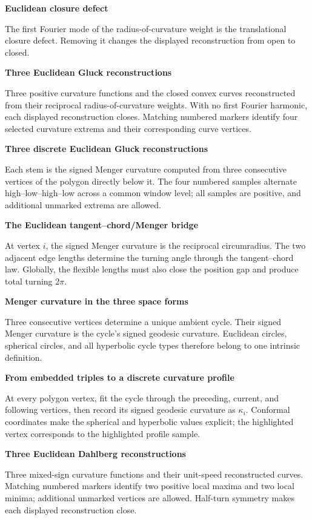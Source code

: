 \documentclass[a4paper,landscape]{article}
\newcommand{\illustrationpage}[3]{%
  \begin{center}
    \vspace*{\fill}
    {\LARGE\bfseries #2\par}
    \vspace{1.25cm}
    \resizebox{0.98\textwidth}{!}{}%
    \vspace{1.1cm}

    \begin{minipage}{0.86\textwidth}
      \centering\large #3
    \end{minipage}
    \vspace*{\fill}
  \end{center}%
}
\begin{document}
\illustrationpage{euclidean-closure}
  {Euclidean closure defect}
  {The first Fourier mode of the radius-of-curvature weight is the
   translational closure defect. Removing it changes the displayed
   reconstruction from open to closed.}

\newpage
\illustrationpage{euclidean-gluck-reconstructions}
  {Three Euclidean Gluck reconstructions}
  {Three positive curvature functions and the closed convex curves reconstructed
   from their reciprocal radius-of-curvature weights. With no first Fourier
   harmonic, each displayed reconstruction closes. Matching numbered markers
   identify four selected curvature extrema and their corresponding curve vertices.}

\newpage
\illustrationpage{discrete-gluck-menger-reconstructions}
  {Three discrete Euclidean Gluck reconstructions}
  {Each stem is the signed Menger curvature computed from three consecutive
   vertices of the polygon directly below it. The four numbered samples
   alternate high--low--high--low across a common window level; all samples are
   positive, and additional unmarked extrema are allowed.}

\newpage
\illustrationpage{discrete-menger-bridge}
  {The Euclidean tangent--chord/Menger bridge}
  {At vertex $i$, the signed Menger curvature is the reciprocal circumradius.
   The two adjacent edge lengths determine the turning angle through the
   tangent--chord law. Globally, the flexible lengths must also close the
   position gap and produce total turning $2\pi$.}

\newpage
\illustrationpage{menger-curvature-spaceforms}
  {Menger curvature in the three space forms}
  {Three consecutive vertices determine a unique ambient cycle. Their signed
   Menger curvature is the cycle's signed geodesic curvature. Euclidean circles,
   spherical circles, and all hyperbolic cycle types therefore belong to one
   intrinsic definition.}

\newpage
\illustrationpage{menger-curvature-profiles-spaceforms}
  {From embedded triples to a discrete curvature profile}
  {At every polygon vertex, fit the cycle through the preceding, current, and
   following vertices, then record its signed geodesic curvature as $\kappa_i$.
   Conformal coordinates make the spherical and hyperbolic values explicit;
   the highlighted vertex corresponds to the highlighted profile sample.}

\newpage
\illustrationpage{euclidean-dahlberg-reconstructions}
  {Three Euclidean Dahlberg reconstructions}
  {Three mixed-sign curvature functions and their unit-speed reconstructed
   curves. Matching numbered markers identify two positive local maxima and two
   local minima; additional unmarked vertices are allowed. Half-turn symmetry
   makes each displayed reconstruction close.}
\end{document}
